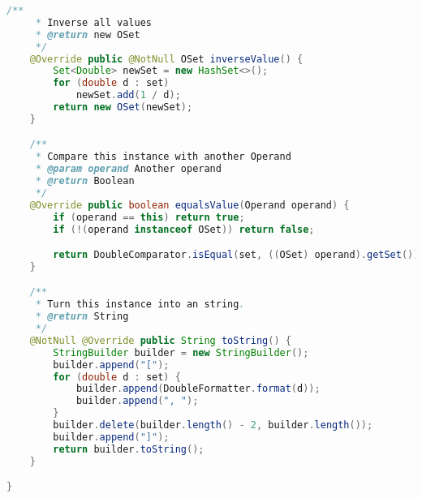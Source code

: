 \begin{lstlisting}[caption=OSet (Schwenke),label=list:OSet,language=Java]
    /**
     * Inverse all values
     * @return new OSet
     */
    @Override public @NotNull OSet inverseValue() {
        Set<Double> newSet = new HashSet<>();
        for (double d : set)
            newSet.add(1 / d);
        return new OSet(newSet);
    }

    /**
     * Compare this instance with another Operand
     * @param operand Another operand
     * @return Boolean
     */
    @Override public boolean equalsValue(Operand operand) {
        if (operand == this) return true;
        if (!(operand instanceof OSet)) return false;

        return DoubleComparator.isEqual(set, ((OSet) operand).getSet());
    }

    /**
     * Turn this instance into an string.
     * @return String
     */
    @NotNull @Override public String toString() {
        StringBuilder builder = new StringBuilder();
        builder.append("[");
        for (double d : set) {
            builder.append(DoubleFormatter.format(d));
            builder.append(", ");
        }
        builder.delete(builder.length() - 2, builder.length());
        builder.append("]");
        return builder.toString();
    }

}
\end{lstlisting}    

